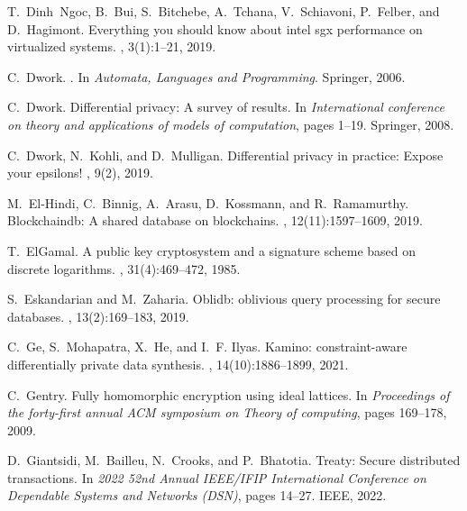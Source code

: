 \documentclass[11pt]{article}
\begin{document}
\begin{thebibliography}{140}
\begin{small}
T.~Dinh~Ngoc, B.~Bui, S.~Bitchebe, A.~Tchana, V.~Schiavoni, P.~Felber, and
  D.~Hagimont.
\newblock Everything you should know about intel sgx performance on virtualized
  systems.
, 3(1):1--21, 2019.

C.~Dwork.
.
\newblock In {\em Automata, Languages and Programming}. Springer, 2006.

C.~Dwork.
\newblock Differential privacy: A survey of results.
\newblock In {\em International conference on theory and applications of models
  of computation}, pages 1--19. Springer, 2008.

C.~Dwork, N.~Kohli, and D.~Mulligan.
\newblock Differential privacy in practice: Expose your epsilons!
, 9(2), 2019.

M.~El-Hindi, C.~Binnig, A.~Arasu, D.~Kossmann, and R.~Ramamurthy.
\newblock Blockchaindb: A shared database on blockchains.
, 12(11):1597--1609, 2019.

T.~ElGamal.
\newblock A public key cryptosystem and a signature scheme based on discrete
  logarithms.
, 31(4):469--472, 1985.

S.~Eskandarian and M.~Zaharia.
\newblock Oblidb: oblivious query processing for secure databases.
, 13(2):169--183, 2019.

C.~Ge, S.~Mohapatra, X.~He, and I.~F. Ilyas.
\newblock Kamino: constraint-aware differentially private data synthesis.
, 14(10):1886--1899, 2021.

C.~Gentry.
\newblock Fully homomorphic encryption using ideal lattices.
\newblock In {\em Proceedings of the forty-first annual ACM symposium on Theory
  of computing}, pages 169--178, 2009.

D.~Giantsidi, M.~Bailleu, N.~Crooks, and P.~Bhatotia.
\newblock Treaty: Secure distributed transactions.
\newblock In {\em 2022 52nd Annual IEEE/IFIP International Conference on
  Dependable Systems and Networks (DSN)}, pages 14--27. IEEE, 2022.


\end{small}
\end{thebibliography}
\end{document}
